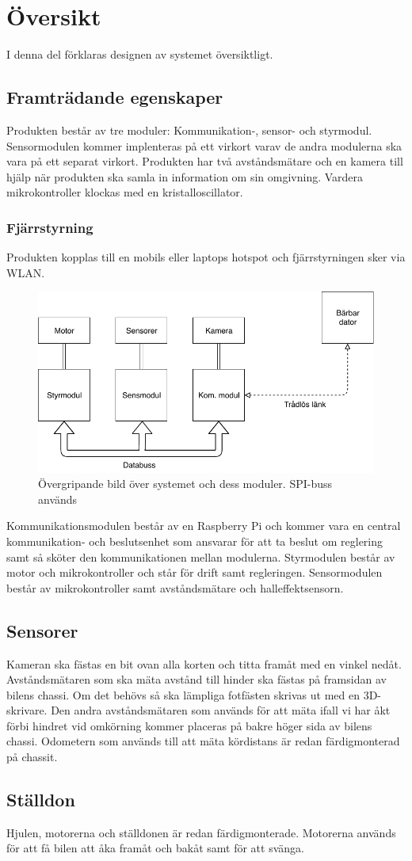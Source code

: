 \documentclass[designspec/spec.tex]{subfiles}
\begin{document}
\section{Översikt}
I denna del förklaras designen av systemet översiktligt.

\subsection{Framträdande egenskaper}
Produkten består av tre moduler: Kommunikation-, sensor- och styrmodul.
Sensormodulen kommer implenteras på ett virkort varav de andra modulerna ska
vara på ett separat virkort. Produkten har två avståndsmätare och en kamera
till hjälp när produkten ska samla in information om sin omgivning. Vardera
mikrokontroller klockas med en kristalloscillator.

\subsubsection{Fjärrstyrning}
Produkten kopplas till en mobils eller laptops hotspot och fjärrstyrningen sker
via WLAN.

\begin{figure}[h]
    \centering
    \includegraphics[width=0.6\linewidth]{designspec/fig/blockskiss.pdf}
    \caption{Övergripande bild över systemet och dess moduler. SPI-buss används}
    \label{fig:overview}
\end{figure}

Kommunikationsmodulen består av en Raspberry Pi och kommer vara en central
kommunikation- och beslutsenhet som ansvarar för att ta beslut om reglering
samt så sköter den kommunikationen mellan modulerna. Styrmodulen består av
motor och mikrokontroller och står för drift samt regleringen. Sensormodulen
består av mikrokontroller samt avståndsmätare och halleffektsensorn.

\subsection{Sensorer}
Kameran ska fästas en bit ovan alla korten och titta framåt med en vinkel
nedåt. Avståndsmätaren som ska mäta avstånd till hinder ska fästas på framsidan
av bilens chassi. Om det behövs så ska lämpliga fotfästen skrivas ut med en
3D-skrivare. Den andra avståndsmätaren som används för att mäta ifall vi har
åkt förbi hindret vid omkörning kommer placeras på bakre höger sida av bilens
chassi. Odometern som används till att mäta kördistans är redan färdigmonterad
på chassit.

\subsection{Ställdon}
Hjulen, motorerna och ställdonen är redan färdigmonterade. Motorerna används
för att få bilen att åka framåt och bakåt samt för att svänga.
\end{document}
